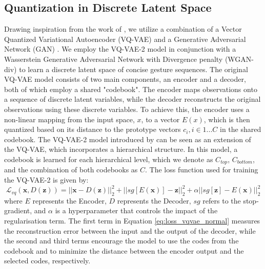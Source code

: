 \documentclass[sigconf]{acmart}
\begin{document}
\subsection{Quantization in Discrete Latent Space} \label{discrete_latent}
Drawing inspiration from the work of \citet{esserTamingTransformersHighResolution2021}, we utilize a combination of a Vector Quantized Variational Autoencoder (VQ-VAE) \cite{van2017neural} and a Generative Adversarial Network (GAN) \cite{goodfellow2020generative,liu2019acceleration}. We employ the VQ-VAE-2 model \cite{razavi2019generating} in conjunction with a Wasserstein Generative Adversarial Network with Divergence penalty (WGAN-div)  \cite{wu2018wasserstein} to learn a discrete latent space of concise gesture sequences.
The original VQ-VAE model \cite{van2017neural} consists of two main components, an encoder and a decoder, both of which employ a shared "codebook". The encoder maps observations onto a sequence of discrete latent variables, while the decoder reconstructs the original observations using these discrete variables. To achieve this, the encoder uses a non-linear mapping from the input space, $x$, to a vector $E(x)$, which is then quantized based on its distance to the prototype vectors $c_i, i \in 1 . . . C$ in the shared codebook. 
The VQ-VAE-2 model introduced by \citet{razavi2019generating} can be seen as an extension of the VQ-VAE, which incorporates a hierarchical structure. In this model, a codebook is learned for each hierarchical level, which we denote as $C_{top}$, $C_{bottom}$, and the combination of both codebooks as $C$. The loss function used for training the VQ-VAE-2 is given by:
\begin{equation}\label{eq:loss_vqvae_normal}
\mathcal{L}_{vq}(\mathbf{x}, D(\mathbf{z}))  = ||\mathbf{x} - D(\mathbf{z})||_2^2 + ||sg[E(\mathbf{x})] - \mathbf{z}||_2^2 + \alpha ||sg[\mathbf{z}] - E(\mathbf{x})||^2_2
\end{equation}
where $E$ represents the Encoder, $D$ represents the Decoder, $sg$ refers to the stop-gradient, and $\alpha$ is a hyperparameter that controls the impact of the regularisation term. The first term in Equation \ref{eq:loss_vqvae_normal} measures the reconstruction error between the input and the output of the decoder, while the second and third terms encourage the model to use the codes from the codebook and to minimize the distance between the encoder output and the selected codes, respectively.
\end{document}
